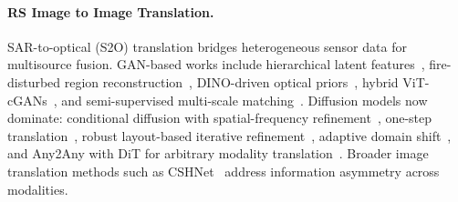\paragraph{RS Image to Image Translation.}
SAR-to-optical (S2O) translation bridges heterogeneous sensor data for multisource fusion. GAN-based works include hierarchical latent features~\cite{wangSARtoOpticalImageTranslation2022}, fire-disturbed region reconstruction~\cite{huGanbasedSAROptical2022}, DINO-driven optical priors~\cite{heDOGANDINOBasedOpticalPriorDriven2025}, hybrid ViT-cGANs~\cite{zhaoHVTcGANHybridVision2025}, and semi-supervised multi-scale matching~\cite{yangS3OILSemiSupervisedSARtoOptical2025}. Diffusion models now dominate: conditional diffusion with spatial-frequency refinement~\cite{qinConditionalDiffusionModel2024,baiConditionalDiffusionSAR2024}, one-step translation~\cite{qinEfficientEndtoEndDiffusion2025}, robust layout-based iterative refinement~\cite{zhaoRLIDMRobustLayoutBased2025}, adaptive domain shift~\cite{wangAdaptiveDomainShift2026a}, and Any2Any with DiT for arbitrary modality translation~\cite{chenAny2AnyUnifiedArbitrary2026}. Broader image translation methods such as CSHNet~\cite{yangCSHNetNovelInformation2026} address information asymmetry across modalities.
